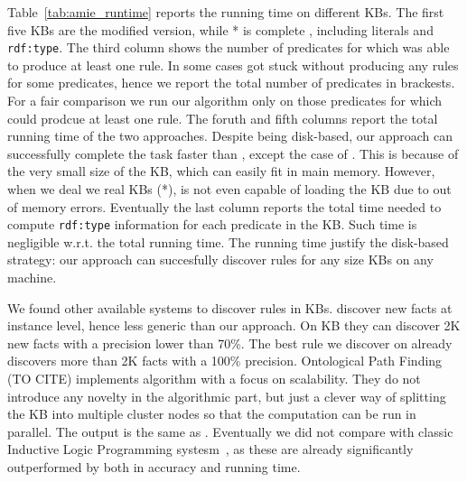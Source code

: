Table~\ref{tab:amie_runtime} reports the running time on different KBs. The first five KBs are the \amie modified version, while * is complete \yago, including literals and \texttt{rdf:type}. The third column shows the number of predicates for which \amie was able to produce at least one rule. In some cases \amie got stuck without producing any rules for some predicates, hence we report the total number of predicates in brackests. For a fair comparison we run our algorithm only on those predicates for which \amie could prodcue at least one rule. The foruth and fifth columns report the total running time of the two approaches. Despite being disk-based, our approach can successfully complete the task faster than \amie, except the case of . This is because of the very small size of the KB, which can easily fit in main memory. However, when we deal we real KBs (*), \amie is not even capable of loading the KB due to out of memory errors. Eventually the last column reports the total time needed to compute \texttt{rdf:type} information for each predicate in the KB. Such time is negligible w.r.t. the total running time. The running time justify the disk-based strategy: our approach can succesfully discover rules for any size KBs on any machine.

We found other available systems to discover rules in KBs. \cite{abedjan2014amending} discover new facts at instance level, hence less generic than our approach. On \amie {} KB they can discover 2K new facts with a precision lower than 70\%. The best rule we discover on  already discovers more than 2K facts with a 100\% precision. Ontological Path Finding (TO CITE) implements \amie algorithm with a focus on scalability. They do not introduce any novelty in the algorithmic part, but just a clever way of splitting the KB into multiple cluster nodes so that the computation can be run in parallel. The output is the same as \amie. Eventually we did not compare with classic Inductive Logic Programming systesm~\cite{dehaspe1999discovery,muggleton1995inverse}, as these are already significantly outperformed by \amie both in accuracy and running time.

